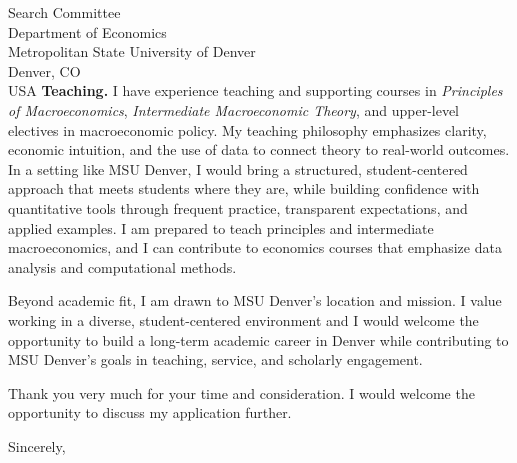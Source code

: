 \documentclass[11pt,letterpaper]{letter}
\begin{document}
\begin{letter}{Search Committee \\
Department of Economics \\
Metropolitan State University of Denver \\
Denver, CO \\ USA}
\textbf{Teaching.} I have experience teaching and supporting courses in \textit{Principles of Macroeconomics}, \textit{Intermediate Macroeconomic Theory}, and upper-level electives in macroeconomic policy. My teaching philosophy emphasizes clarity, economic intuition, and the use of data to connect theory to real-world outcomes. In a setting like MSU Denver, I would bring a structured, student-centered approach that meets students where they are, while building confidence with quantitative tools through frequent practice, transparent expectations, and applied examples. I am prepared to teach principles and intermediate macroeconomics, and I can contribute to economics courses that emphasize data analysis and computational methods.

Beyond academic fit, I am drawn to MSU Denver’s location and mission. I value working in a diverse, student-centered environment and I would welcome the opportunity to build a long-term academic career in Denver while contributing to MSU Denver’s goals in teaching, service, and scholarly engagement.

Thank you very much for your time and consideration. I would welcome the opportunity to discuss my application further.

\closing{Sincerely,}

\end{letter}
\end{document}
